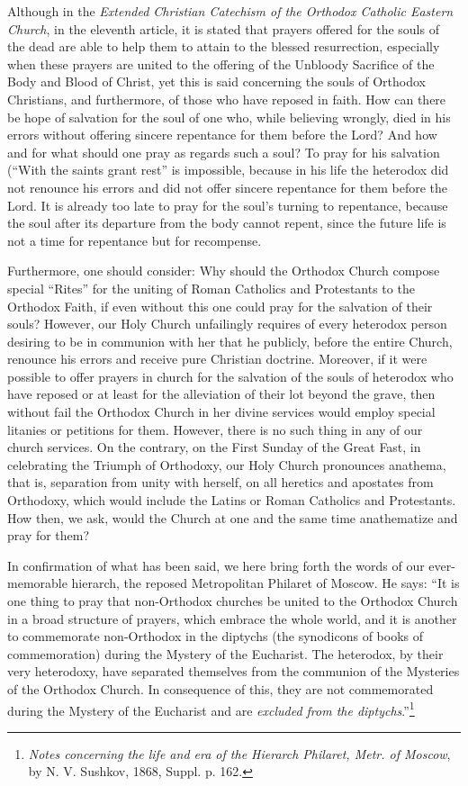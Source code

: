 Although in the \textit{Extended Christian Catechism of the Orthodox Catholic Eastern Church}, in the eleventh article, it is stated that prayers offered for the souls of the dead are able to help them to attain to the blessed resurrection, especially when these prayers are united to the offering of the Unbloody Sacrifice of the Body and Blood of Christ, yet this is said concerning the souls of Orthodox Christians, and furthermore, of those who have reposed in faith. How can there be hope of salvation for the soul of one who, while believing wrongly, died in his errors without offering sincere repentance for them before the Lord? And how and for what should one pray as regards such a soul? To pray for his salvation (``With the saints grant rest'' is impossible, because in his life the heterodox did not renounce his errors and did not offer sincere repentance for them before the Lord. It is already too late to pray for the soul's turning to repentance, because the soul after its departure from the body cannot repent, since the future life is not a time for repentance but for recompense.

Furthermore, one should consider: Why should the Orthodox Church compose special ``Rites'' for the uniting of Roman Catholics and Protestants to the Orthodox Faith, if even without this one could pray for the salvation of their souls? However, our Holy Church unfailingly requires of every heterodox person desiring to be in communion with her that he publicly, before the entire Church, renounce his errors and receive pure Christian doctrine. Moreover, if it were possible to offer prayers in church for the salvation of the souls of heterodox who have reposed or at least for the alleviation of their lot beyond the grave, then without fail the Orthodox Church in her divine services would employ special litanies or petitions for them. However, there is no such thing in any of our church services. On the contrary, on the First Sunday of the Great Fast, in celebrating the Triumph of Orthodoxy, our Holy Church pronounces anathema, that is, separation from unity with herself, on all heretics and apostates from Orthodoxy, which would include the Latins or Roman Catholics and Protestants. How then, we ask, would the Church at one and the same time anathematize and pray for them?

In confirmation of what has been said, we here bring forth the words of our ever-memorable hierarch, the reposed Metropolitan Philaret of Moscow. He says: ``It is one thing to pray that non-Orthodox churches be united to the Orthodox Church in a broad structure of prayers, which embrace the whole world, and it is another to commemorate non-Orthodox in the diptychs (the synodicons of books of commemoration) during the Mystery of the Eucharist. The heterodox, by their very heterodoxy, have separated themselves from the communion of the Mysteries of the Orthodox Church. In consequence of this, they are not commemorated during the Mystery of the Eucharist and are \textit{excluded from the diptychs}.''\footnote{\textit{Notes concerning the life and era of the Hierarch Philaret, Metr. of Moscow}, by N. V. Sushkov, 1868, Suppl. p. 162.}

